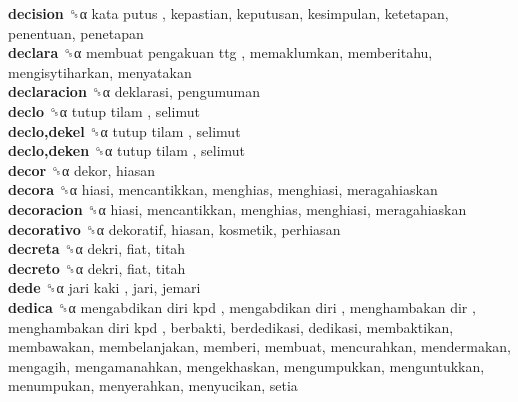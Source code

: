 \textbf{decision} ␝α   kata putus , kepastian, keputusan, kesimpulan, ketetapan, penentuan, penetapan  \\
\textbf{declara} ␝α   membuat pengakuan ttg , memaklumkan, memberitahu, mengisytiharkan, menyatakan  \\
\textbf{declaracion} ␝α  deklarasi, pengumuman  \\
\textbf{declo} ␝α   tutup tilam , selimut  \\
\textbf{declo,dekel} ␝α   tutup tilam , selimut  \\
\textbf{declo,deken} ␝α   tutup tilam , selimut  \\
\textbf{decor} ␝α  dekor, hiasan  \\
\textbf{decora} ␝α  hiasi, mencantikkan, menghias, menghiasi, meragahiaskan  \\
\textbf{decoracion} ␝α  hiasi, mencantikkan, menghias, menghiasi, meragahiaskan  \\
\textbf{decorativo} ␝α  dekoratif, hiasan, kosmetik, perhiasan  \\
\textbf{decreta} ␝α  dekri, fiat, titah  \\
\textbf{decreto} ␝α  dekri, fiat, titah  \\
\textbf{dede} ␝α   jari kaki , jari, jemari  \\
\textbf{dedica} ␝α   mengabdikan diri kpd ,  mengabdikan diri ,  menghambakan dir ,  menghambakan diri kpd , berbakti, berdedikasi, dedikasi, membaktikan, membawakan, membelanjakan, memberi, membuat, mencurahkan, mendermakan, mengagih, mengamanahkan, mengekhaskan, mengumpukkan, menguntukkan, menumpukan, menyerahkan, menyucikan, setia  \\
